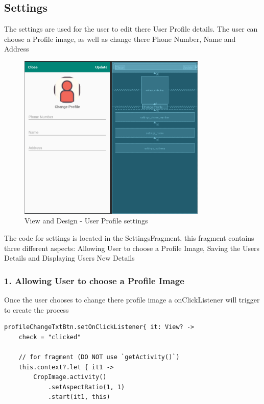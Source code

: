 \subsection{Settings}
The settings are used for the user to edit there User Profile details.
The user can choose a Profile image, as well as change there Phone Number, Name and Address

\begin{figure}[h!]
	\caption{View and Design - User Profile settings}
	\label{productview}
	\centering
	\includegraphics[width=0.8\textwidth]{Images/user_profile_settings_change.png}
\end{figure}

The code for settings is located in the SettingsFragment, this fragment contains three different aspects: Allowing User to choose a Profile Image, Saving the Users Details and Displaying Users New Details

\subsubsection{1. Allowing User to choose a Profile Image}
Once the user chooses to change there profile image a onClickListener will trigger to create the process
\begin{verbatim}
profileChangeTxtBtn.setOnClickListener{ it: View? ->
    check = "clicked"

    // for fragment (DO NOT use `getActivity()`)
    this.context?.let { it1 ->
        CropImage.activity()
            .setAspectRatio(1, 1)
            .start(it1, this)
\end{verbatim}

